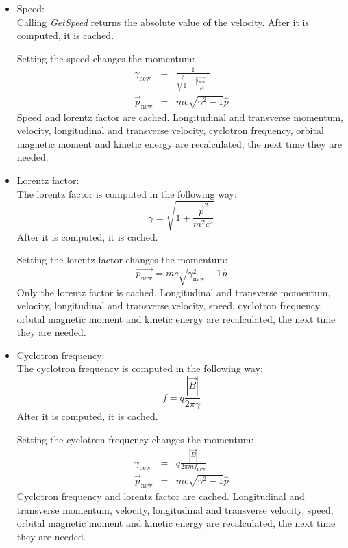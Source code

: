 \begin{itemize}
		\item Speed:\\
		Calling \textit{GetSpeed} returns the absolute value of the velocity. After it is computed, it is cached.   
		
		Setting the speed changes the momentum:
		\begin{eqnarray}
			\gamma_{\mathrm{new}} &=& \frac{1}{\sqrt{1-\frac{ | \vec{v_{\mathrm{new}}} |^2}{c^2}}}\\
			\vec{p}_{\mathrm{new}} &=& m c \sqrt{\gamma^2 -1} \hat{p}  
		\end{eqnarray} 
		Speed and lorentz factor are cached.
		Longitudinal and transverse momentum, velocity, longitudinal and transverse velocity, cyclotron frequency, orbital magnetic moment and kinetic energy are recalculated, the next time they are needed.
    
		\item Lorentz factor:\\
		The lorentz factor is computed in the following way:
		\begin{equation}
			\gamma = \sqrt{1+\frac{\vec{p}^2}{m^2 c^2}}
		\end{equation}
		After it is computed, it is cached.      
		
		Setting the lorentz factor changes the momentum:
		\begin{equation}
			\vec{p_{\mathrm{new}}} = m c \sqrt{\gamma_{\mathrm{new}}^2 - 1} \hat{p}
		\end{equation}    
		Only the lorentz factor is cached. Longitudinal and transverse momentum, velocity, longitudinal and transverse velocity, speed, cyclotron frequency, orbital magnetic moment and kinetic energy are recalculated, the next time they are needed.
    
		\item Cyclotron frequency:\\
		The cyclotron frequency is computed in the following way:
		\begin{equation}
			f = q \frac{|\vec{B}| }{2 \pi \gamma}
		\end{equation}
		After it is computed, it is cached.  
		
		Setting the cyclotron frequency changes the momentum:
		\begin{eqnarray}
			\gamma_{\mathrm{new}} &=& q \frac{|\vec{B}|}{2\pi m f_{\mathrm{new}}} \\
			\vec{p}_{\mathrm{new}} &=& m c \sqrt{\gamma^2 - 1} \hat{p}  
		\end{eqnarray} 
		Cyclotron frequency and lorentz factor are cached. Longitudinal and transverse momentum, velocity, longitudinal and transverse velocity, speed, orbital magnetic moment and kinetic energy are recalculated, the next time they are needed.
    
	\end{itemize}


